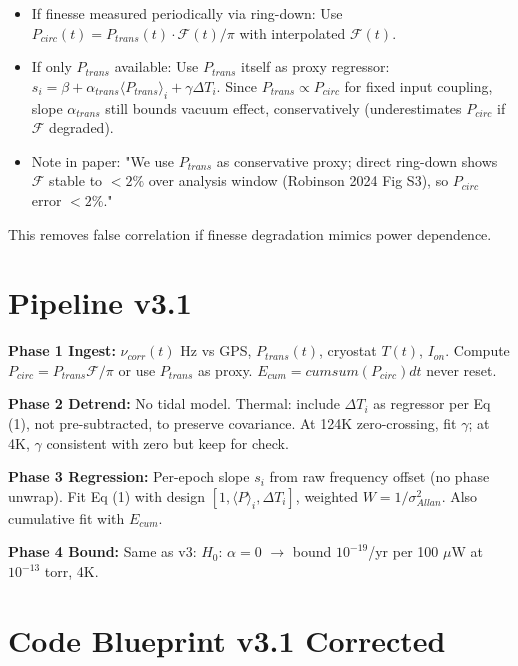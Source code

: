 \documentclass[11pt,a4paper]{article}
\begin{document}
\begin{itemize}
\item If finesse measured periodically via ring-down: Use $P_{circ}(t)=P_{trans}(t)\cdot\mathcal{F}(t)/\pi$ with interpolated $\mathcal{F}(t)$.
\item If only $P_{trans}$ available: Use $P_{trans}$ itself as proxy regressor: $s_i = \beta + \alpha_{trans}\langle P_{trans}\rangle_i + \gamma\Delta T_i$. Since $P_{trans}\propto P_{circ}$ for fixed input coupling, slope $\alpha_{trans}$ still bounds vacuum effect, conservatively (underestimates $P_{circ}$ if $\mathcal{F}$ degraded).
\item Note in paper: "We use $P_{trans}$ as conservative proxy; direct ring-down shows $\mathcal{F}$ stable to $<2\%$ over analysis window (Robinson 2024 Fig S3), so $P_{circ}$ error $<2\%$."
\end{itemize}

This removes false correlation if finesse degradation mimics power dependence.

\section{Pipeline v3.1}

\textbf{Phase 1 Ingest:} $\nu_{corr}(t)$ Hz vs GPS, $P_{trans}(t)$, cryostat $T(t)$, $I_{on}$. Compute $P_{circ}=P_{trans}\mathcal{F}/\pi$ or use $P_{trans}$ as proxy. $E_{cum}=cumsum(P_{circ})dt$ never reset.

\textbf{Phase 2 Detrend:} No tidal model. Thermal: include $\Delta T_i$ as regressor per Eq (1), not pre-subtracted, to preserve covariance. At 124K zero-crossing, fit $\gamma$; at 4K, $\gamma$ consistent with zero but keep for check.

\textbf{Phase 3 Regression:} Per-epoch slope $s_i$ from raw frequency offset (no phase unwrap). Fit Eq (1) with design $[1, \langle P\rangle_i, \Delta T_i]$, weighted $W=1/\sigma_{Allan}^2$. Also cumulative fit with $E_{cum}$.

\textbf{Phase 4 Bound:} Same as v3: $H_0$: $\alpha=0$ $\rightarrow$ bound $10^{-19}$/yr per 100 $\mu$W at $10^{-13}$ torr, 4K.

\section{Code Blueprint v3.1 Corrected}
\end{document}
